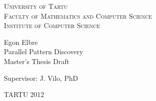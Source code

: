 \begin{titlepage}
\begin{center}

{\scshape
    University of Tartu                  \\[2mm]
    Faculty of Mathematics and Computer Science   \\[3mm]
    Institute of Computer Science
}

  {\Large Egon Elbre } \\[5mm]
  {\Huge  Parallel Pattern Discovery } \\[5mm]
  {\large Master's Thesis Draft}

\begin{flushright}
    {\Large Supervisor: J. Vilo, PhD }
\end{flushright}


{\large TARTU 2012 }

\end{center}
\end{titlepage}

